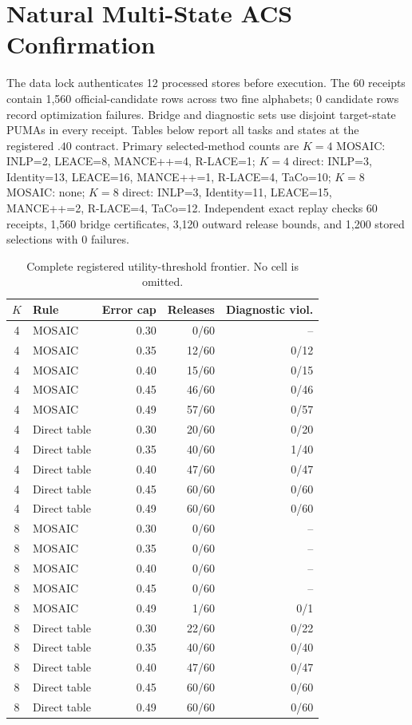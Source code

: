 \section{Natural Multi-State ACS Confirmation}
The data lock authenticates 12 processed stores before execution. The 60 receipts contain 1,560 official-candidate rows across two fine alphabets; 0 candidate rows record optimization failures. Bridge and diagnostic sets use disjoint target-state PUMAs in every receipt. Tables below report all tasks and states at the registered $.40$ contract. Primary selected-method counts are $K=4$ MOSAIC: INLP=2, LEACE=8, MANCE++=4, R-LACE=1; $K=4$ direct: INLP=3, Identity=13, LEACE=16, MANCE++=1, R-LACE=4, TaCo=10; $K=8$ MOSAIC: none; $K=8$ direct: INLP=3, Identity=11, LEACE=15, MANCE++=2, R-LACE=4, TaCo=12.
Independent exact replay checks 60 receipts, 1,560 bridge certificates, 3,120 outward release bounds, and 1,200 stored selections with 0 failures.

\begin{table}[t]
\centering
\scriptsize
\setlength{\tabcolsep}{3.5pt}
\begin{tabular}{clrrr}
\hline
$K$ & Rule & Error cap & Releases & Diagnostic viol. \\
\hline
4 & MOSAIC & 0.30 & 0/60 & -- \\
4 & MOSAIC & 0.35 & 12/60 & 0/12 \\
4 & MOSAIC & 0.40 & 15/60 & 0/15 \\
4 & MOSAIC & 0.45 & 46/60 & 0/46 \\
4 & MOSAIC & 0.49 & 57/60 & 0/57 \\
4 & Direct table & 0.30 & 20/60 & 0/20 \\
4 & Direct table & 0.35 & 40/60 & 1/40 \\
4 & Direct table & 0.40 & 47/60 & 0/47 \\
4 & Direct table & 0.45 & 60/60 & 0/60 \\
4 & Direct table & 0.49 & 60/60 & 0/60 \\
8 & MOSAIC & 0.30 & 0/60 & -- \\
8 & MOSAIC & 0.35 & 0/60 & -- \\
8 & MOSAIC & 0.40 & 0/60 & -- \\
8 & MOSAIC & 0.45 & 0/60 & -- \\
8 & MOSAIC & 0.49 & 1/60 & 0/1 \\
8 & Direct table & 0.30 & 22/60 & 0/22 \\
8 & Direct table & 0.35 & 40/60 & 0/40 \\
8 & Direct table & 0.40 & 47/60 & 0/47 \\
8 & Direct table & 0.45 & 60/60 & 0/60 \\
8 & Direct table & 0.49 & 60/60 & 0/60 \\
\hline
\end{tabular}
\caption{Complete registered utility-threshold frontier. No cell is omitted.}
\label{supp:tab:acs-natural-thresholds}
\end{table}

